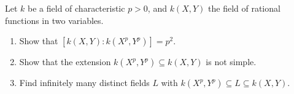 \begin{problem}
  Let \(k\) be a field of characteristic \(p>0\), and \(k(X,Y)\) the field
  of rational functions in two variables.
\begin{enumerate}[label=(\alph*),noitemsep]
\item Show that \(\left[k(X,Y):k(X^p,Y^p)\right]=p^2\).
\item Show that the extension \(k(X^p,Y^p)\subseteq k(X,Y)\) is not simple.
\item Find infinitely many distinct fields \(L\) with
  \(k(X^p,Y^p)\subseteq L\subseteq k(X,Y)\).
\end{enumerate}
\end{problem}
\begin{solution}
\end{solution}

